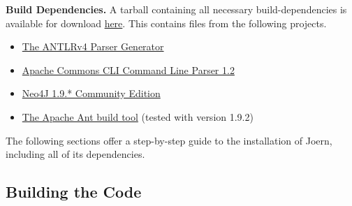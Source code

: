 \documentclass[a4paper]{article}
\begin{document}
\textbf{Build Dependencies.} A tarball containing all necessary
build-dependencies is available for download
\href{http://mlsec.org/joern/lib/lib.tar.gz}{here}. This contains
files from the following projects.

\begin{itemize}
  \item \href{http://www.antlr.org/}{The ANTLRv4 Parser Generator}
  \item \href{http://commons.apache.org/proper/commons-cli/}{Apache Commons CLI Command Line Parser 1.2}
  \item \href{http://www.neo4j.org/download/other\_versions}{Neo4J 1.9.* Community Edition}
  \item \href{http://ant.apache.org/}{The Apache Ant build tool} (tested with version 1.9.2)
\end{itemize}

The following sections offer a step-by-step guide to the installation
of Joern, including all of its dependencies.

\subsection{Building the Code}
\end{document}
